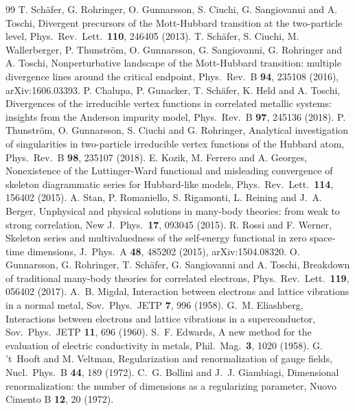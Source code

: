 \documentclass[11pt,a4paper]{article}
\begin{document}
\begin{thebibliography}{99}
 T. Sch\"afer, G. Rohringer, O. Gunnarsson, S. Ciuchi, G. Sangiovanni and A. Toschi, Divergent
  precursors of the Mott-Hubbard transition at the two-particle level, Phys.\ Rev.\ Lett.\ \textbf{110}, 246405 (2013).
 T. Sch\"afer, S. Ciuchi, M. Wallerberger, P. Thunstr\"om, O. Gunnarsson, G. Sangiovanni,
  G. Rohringer and A. Toschi, Nonperturbative landscape of the Mott-Hubbard transition: multiple divergence lines around the
  critical endpoint, Phys.\ Rev.\ B \textbf{94}, 235108 (2016), arXiv:1606.03393.
 P. Chalupa, P. Gunacker, T. Sch\"afer, K. Held and A. Toschi, Divergences of the irreducible vertex
  functions in correlated metallic systems: insights from the Anderson impurity model, Phys.\ Rev.\ B \textbf{97}, 245136
  (2018).
 P. Thunstr\"om, O. Gunnarsson, S. Ciuchi and G. Rohringer, Analytical investigation of
  singularities in two-particle irreducible vertex functions of the Hubbard atom, Phys.\ Rev.\ B \textbf{98}, 235107 (2018).
 E. Kozik, M. Ferrero and A. Georges, Nonexistence of the Luttinger-Ward functional and
  misleading convergence of skeleton diagrammatic series for Hubbard-like models, Phys.\ Rev.\ Lett.\ \textbf{114}, 156402
  (2015).
 A. Stan, P. Romaniello, S. Rigamonti, L. Reining and J.~A. Berger, Unphysical and physical
  solutions in many-body theories: from weak to strong correlation, New J.\ Phys.\ \textbf{17}, 093045 (2015).
 R. Rossi and F. Werner, Skeleton series and multivaluedness of the self-energy functional in zero
  space-time dimensions, J.\ Phys.\ A \textbf{48}, 485202 (2015), arXiv:1504.08320.
 O. Gunnarsson, G. Rohringer, T. Sch\"afer, G. Sangiovanni and A. Toschi, Breakdown of traditional
  many-body theories for correlated electrons, Phys.\ Rev.\ Lett.\ \textbf{119}, 056402 (2017).
 A.~B. Migdal, Interaction between electrons and lattice vibrations in a normal metal, Sov.\ Phys.\ JETP \textbf{7}, 996 (1958).
 G.~M. Eliashberg, Interactions between electrons and lattice vibrations in a superconductor, Sov.\ Phys.\ JETP \textbf{11}, 696 (1960).
 S.~F. Edwards, A new method for the evaluation of electric conductivity in metals, Phil.\ Mag.\ \textbf{3}, 1020 (1958).
 G. 't~Hooft and M. Veltman, Regularization and renormalization of gauge fields, Nucl.\ Phys.\ B \textbf{44}, 189 (1972).
 C.~G. Bollini and J.~J. Giambiagi, Dimensional renormalization: the number of dimensions as a regularizing parameter, Nuovo Cimento B \textbf{12}, 20 (1972).

\end{thebibliography}
\end{document}
